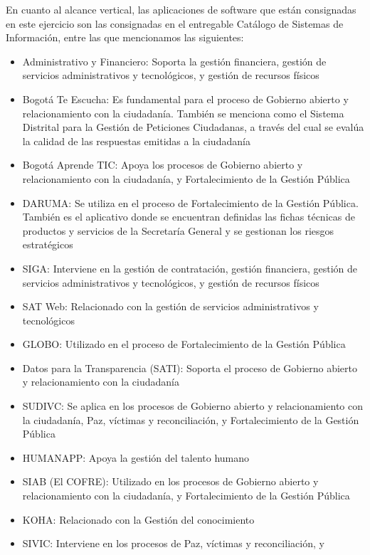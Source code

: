 \documentclass[
	a4paper, %
	12pt, %
]{include/CSSullivanBusinessReport}
\def\tightlist{}
\begin{document}
En cuanto al alcance vertical, las aplicaciones de software que están
consignadas en este ejercicio son las consignadas en el entregable
Catálogo de Sistemas de Información, entre las que mencionamos las
siguientes:

\begin{itemize}
\tightlist
\item
  Administrativo y Financiero: Soporta la gestión financiera, gestión de
  servicios administrativos y tecnológicos, y gestión de recursos
  físicos
\item
  Bogotá Te Escucha: Es fundamental para el proceso de Gobierno abierto
  y relacionamiento con la ciudadanía. También se menciona como el
  Sistema Distrital para la Gestión de Peticiones Ciudadanas, a través
  del cual se evalúa la calidad de las respuestas emitidas a la
  ciudadanía
\item
  Bogotá Aprende TIC: Apoya los procesos de Gobierno abierto y
  relacionamiento con la ciudadanía, y Fortalecimiento de la Gestión
  Pública
\item
  DARUMA: Se utiliza en el proceso de Fortalecimiento de la Gestión
  Pública. También es el aplicativo donde se encuentran definidas las
  fichas técnicas de productos y servicios de la Secretaría General y se
  gestionan los riesgos estratégicos
\item
  SIGA: Interviene en la gestión de contratación, gestión financiera,
  gestión de servicios administrativos y tecnológicos, y gestión de
  recursos físicos
\item
  SAT Web: Relacionado con la gestión de servicios administrativos y
  tecnológicos
\item
  GLOBO: Utilizado en el proceso de Fortalecimiento de la Gestión
  Pública
\item
  Datos para la Transparencia (SATI): Soporta el proceso de Gobierno
  abierto y relacionamiento con la ciudadanía
\item
  SUDIVC: Se aplica en los procesos de Gobierno abierto y
  relacionamiento con la ciudadanía, Paz, víctimas y reconciliación, y
  Fortalecimiento de la Gestión Pública
\item
  HUMANAPP: Apoya la gestión del talento humano
\item
  SIAB (El COFRE): Utilizado en los procesos de Gobierno abierto y
  relacionamiento con la ciudadanía, y Fortalecimiento de la Gestión
  Pública
\item
  KOHA: Relacionado con la Gestión del conocimiento
\item
  SIVIC: Interviene en los procesos de Paz, víctimas y reconciliación, y

\end{itemize}
\end{document}
